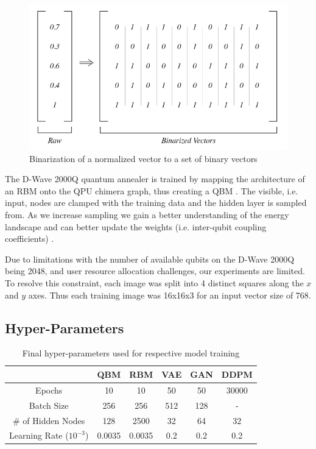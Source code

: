 \documentclass[%
 reprint,
 amsmath,amssymb,
 aps,
]{revtex4-2}
\begin{document}
\begin{figure}[h]
    \includegraphics[width=0.9\columnwidth]{binarize.png}
    \caption{\label{fig:binarize} Binarization of a normalized vector to a set of binary vectors \cite{Jain2020}}
\end{figure}


The D-Wave 2000Q quantum annealer is trained by mapping the architecture of an RBM onto the QPU chimera graph, thus creating a QBM \cite{dwavedocs}. The visible, i.e. input, nodes are clamped with the training data and the hidden layer is sampled from. As we increase sampling we gain a better understanding of the energy landscape and can better update the weights (i.e. inter-qubit coupling coefficients) \cite{Jain2020}.


Due to limitations with the number of available qubits on the D-Wave 2000Q being 2048, and user resource allocation challenges, our experiments are limited. To resolve this constraint, each image was split into 4 distinct squares along the $x$ and $y$ axes. Thus each training image was 16x16x3 for an input vector size of 768.

\subsection{Hyper-Parameters}

\begin{table}[h]
\caption{\label{tab:hyperparams} Final hyper-parameters used for respective model training}
\begin{ruledtabular}
\begin{tabular}{cccccc}
& QBM & RBM & VAE & GAN & DDPM\\\hline
 Epochs & 10 & 10 & 50 & 50 & 30000\\ \hline
 Batch Size & 256 & 256 & 512 & 128 & - \\ \hline
 \# of Hidden Nodes & 128 & 2500 & 32 & 64 & 32 \\ \hline
 Learning Rate ($10^{-3}$) & 0.0035 & 0.0035 & 0.2 & 0.2 & 0.2
\end{tabular}
\end{ruledtabular}
\end{table}
\end{document}
